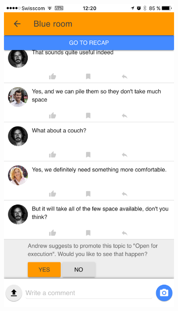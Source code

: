 \documentclass[a4paper,12pt, oneside]{article}
\begin{document}
\begin{figure}[!htb]
\begin{subfigure}[t]{.32\textwidth}
        \includegraphics[width=\textwidth]{images/promotionPoll_question.png}
    \end{subfigure}
    \hfill
    \begin{subfigure}[t]{.32\textwidth}

\end{subfigure}
\end{figure}
\end{document}

